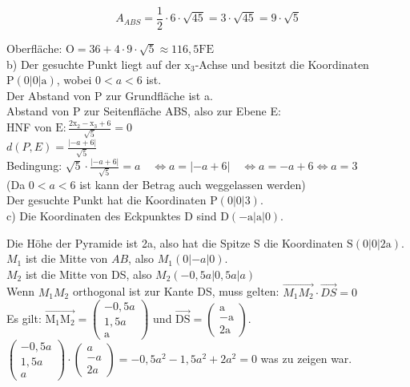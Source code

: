 \documentclass[10pt]{article}
\begin{document}
$$
A_{A B S}=\frac{1}{2} \cdot 6 \cdot \sqrt{45}=3 \cdot \sqrt{45}=9 \cdot \sqrt{5}
$$

Oberfläche: $\mathrm{O}=36+4 \cdot 9 \cdot \sqrt{5} \approx 116,5 \mathrm{FE}$\\
b) Der gesuchte Punkt liegt auf der $\mathrm{x}_{3}$-Achse und besitzt die Koordinaten $\mathrm{P}(0|0| \mathrm{a})$, wobei $0<a<6$ ist.\\
Der Abstand von P zur Grundfläche ist a.\\
Abstand von P zur Seitenfläche ABS, also zur Ebene E:\\
HNF von $\mathrm{E}: \frac{2 \mathrm{x}_{2}-\mathrm{x}_{3}+6}{\sqrt{5}}=0$\\
$d(P, E)=\frac{|-a+6|}{\sqrt{5}}$\\
Bedingung: $\sqrt{5} \cdot \frac{|-a+6|}{\sqrt{5}}=a \quad \Leftrightarrow a=|-a+6| \quad \Leftrightarrow a=-a+6 \Leftrightarrow a=3$\\
(Da $0<a<6$ ist kann der Betrag auch weggelassen werden)\\
Der gesuchte Punkt hat die Koordinaten $\mathrm{P}(0|0| 3)$.\\
c) Die Koordinaten des Eckpunktes D sind $\mathrm{D}(-\mathrm{a}|\mathrm{a}| 0)$.

Die Höhe der Pyramide ist 2a, also hat die Spitze S die Koordinaten $\mathrm{S}(0|0| 2 \mathrm{a})$.\\
$M_{1}$ ist die Mitte von $A B$, also $M_{1}(0|-a| 0)$.\\
$M_{2}$ ist die Mitte von DS, also $M_{2}(-0,5 a|0,5 a| a)$\\
Wenn $M_{1} M_{2}$ orthogonal ist zur Kante DS, muss gelten: $\overrightarrow{M_{1} M_{2}} \cdot \overrightarrow{D S}=0$\\
Es gilt: $\overrightarrow{\mathrm{M}_{1} \mathrm{M}_{2}}=\left(\begin{array}{c}-0,5 a \\ 1,5 a \\ \mathrm{a}\end{array}\right)$ und $\overrightarrow{\mathrm{DS}}=\left(\begin{array}{c}\mathrm{a} \\ -\mathrm{a} \\ 2 \mathrm{a}\end{array}\right)$.\\
$\left(\begin{array}{c}-0,5 a \\ 1,5 a \\ a\end{array}\right) \cdot\left(\begin{array}{c}a \\ -a \\ 2 a\end{array}\right)=-0,5 a^{2}-1,5 a^{2}+2 a^{2}=0$ was zu zeigen war.
\end{document}
